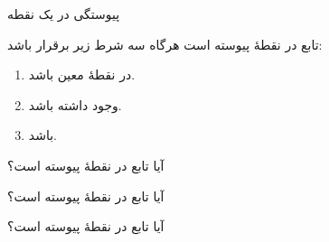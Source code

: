 \begin{EMunit}


\end{EMunit}

\EMhold


\begin{EMdefinition}{پیوستگی در یک نقطه}

تابع  در نقطهٔ  پیوسته است هرگاه سه شرط زیر برقرار باشد:

\begin{enumerate}
\def\labelenumi{\arabic{enumi}.}
\tightlist
\item
   در نقطهٔ  معین باشد.
\item
   وجود داشته باشد.
\item
   باشد.
\end{enumerate}

\end{EMdefinition}

\begin{EMexample}{}

آیا تابع  در نقطهٔ  پیوسته است؟

\end{EMexample}

\begin{EMexample}{}

آیا تابع
در نقطهٔ  پیوسته است؟

\end{EMexample}

\begin{EMexample}{}

آیا تابع
در نقطهٔ  پیوسته است؟

\end{EMexample}

